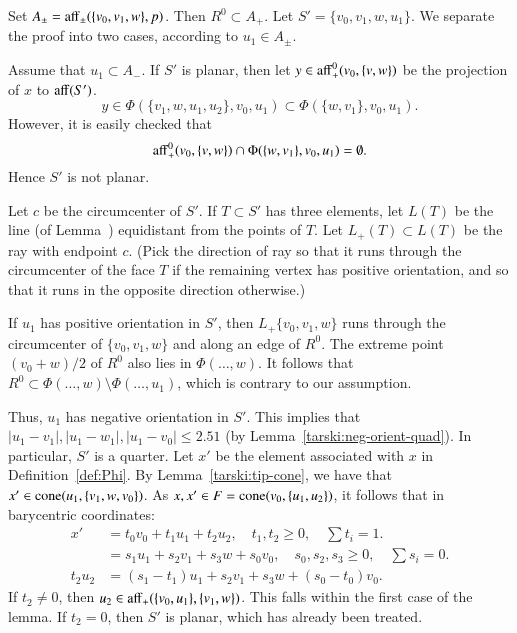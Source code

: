 \begin{tarskidata}
\begin{tarski}
\begin{proved} 
Set 
$A_\pm={\operatorname{aff}}_\pm(\{v_0,v_1,w\},p)$. Then $R^0\subset A_+$.
Let $S'=\{v_0,v_1,w,u_1\}$.  
We separate the proof into two cases, according to $u_1\in A_\pm$.

Assume that $u_1\subset A_-$.  If $S'$ is planar, then let
$y\in{\operatorname{aff}}_+^0(v_0,\{v,w\})$ be the projection of $x$ to ${\operatorname{aff}}(S')$.
$$y\in\Phi(\{v_1,w,u_1,u_2\},v_0,u_1)\subset\Phi(\{w,v_1\},v_0,u_1).$$
However, it is easily checked that
$${\operatorname{aff}}_+^0(v_0,\{v,w\}) \cap \Phi(\{w,v_1\},v_0,u_1) =\emptyset.$$
Hence $S'$ is not planar.

Let $c$ be the circumcenter of $S'$.  If $T\subset S'$ has three elements, let $L(T)$
be the line (of Lemma~) equidistant from the points of $T$.
Let $L_+(T)\subset L(T)$ be the ray with endpoint $c$.  
(Pick the direction
of ray so that it runs through the circumcenter of the face $T$
if the remaining vertex has positive orientation, and so that it
runs in the opposite direction otherwise.)

If $u_1$ has positive orientation in $S'$, then $L_+\{v_0,v_1,w\}$ runs through
the circumcenter of $\{v_0,v_1,w\}$ and along an edge of $R^0$.
The extreme point $(v_0+w)/2$ of  $R^0$ also lies in $\Phi(\ldots,w)$.
It follows that $R^0\subset \Phi(\ldots,w)\setminus\Phi(\ldots,u_1)$, which is contrary
to our assumption.

Thus, $u_1$ has negative orientation in $S'$.  
This implies that $|u_1-v_1|,|u_1-w_1|,|u_1-v_0|\le 2.51$ (by Lemma~\ref{tarski:neg-orient-quad}).  
In particular,
$S'$ is a quarter.  Let $x'$ be the element associated with $x$ in Definition~\ref{def:Phi}. 
By Lemma~\ref{tarski:tip-cone}, we have
that $x'\in {\operatorname{cone}}(u_1,\{v_1,w,v_0\})$.  As $x,x'\in F = {\operatorname{cone}}(v_0,\{u_1,u_2\})$, it follows that 
in barycentric coordinates:
$$
\begin{array}{lll}
x' &= t_0 v_0 + t_1 u_1 +t_2 u_2,\quad t_1,t_2\ge0,\quad \sum t_i = 1.\\
   &= s_1 u_1 + s_2 v_1 + s_3 w + s_0 v_0,\quad s_0,s_2,s_3\ge 0,\quad \sum s_i = 0.\\
t_2 u_2 &= (s_1-t_1) u_1 + s_2 v_1 + s_3 w + (s_0-t_0) v_0.
\end{array}
$$
If $t_2\ne 0$, then $u_2\in{\operatorname{aff}}_+(\{v_0,u_1\},\{v_1,w\})$.
This falls within the first case of the lemma.
If $t_2=0$, then $S'$ is planar, which has already been treated.


\end{proved}
\end{tarski}
\end{tarskidata}
